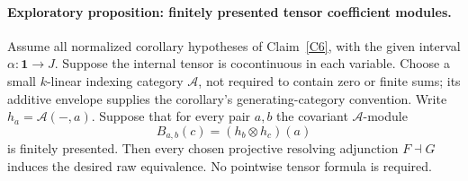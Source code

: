 \paragraph{Exploratory proposition: finitely presented tensor coefficient modules.}
Assume all normalized corollary hypotheses of Claim~\ref{C6}, with the given interval $\alpha:\mathbf1\to J$. Suppose the internal tensor is cocontinuous in each variable. Choose a small $k$-linear indexing category $\mathcal A$, not required to contain zero or finite sums; its additive envelope supplies the corollary's generating-category convention. Write $h_a=\mathcal A(-,a)$. Suppose that for every pair $a,b$ the covariant $\mathcal A$-module
\[
 B_{a,b}(c)=(h_b\otimes h_c)(a)
\]
is finitely presented. Then every chosen projective resolving adjunction $F\dashv G$ induces the desired raw equivalence. No pointwise tensor formula is required.
